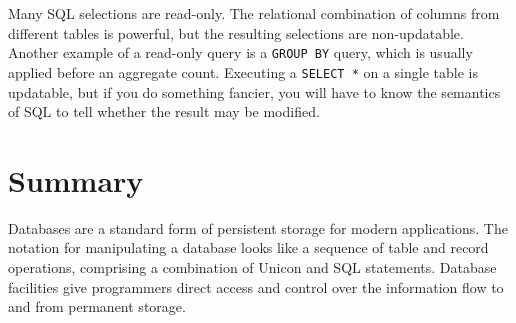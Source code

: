 Many SQL selections are read-only.  The relational combination of
columns from different tables is powerful, but the resulting
selections are non-updatable.  Another example of a read-only query is
a \texttt{GROUP BY} query, which is usually applied before an
aggregate count. Executing a \texttt{SELECT *} on a single table is
updatable, but if you do something fancier, you will have to know the
semantics of SQL to tell whether the result may be modified.

\section{Summary}

Databases are a standard form of persistent storage for modern
applications. The notation for manipulating a database looks like
a sequence of table and record operations, comprising a
combination of Unicon and SQL statements. Database
facilities give programmers direct access and control over the
information flow to and from permanent storage.
